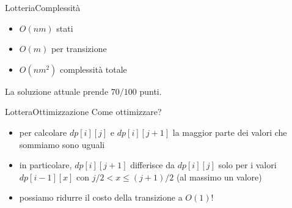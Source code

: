 \documentclass{beamer}
\begin{document}
\begin{frame}
\end{frame}

\begin{frame}{Lotteria}{Complessit\`a}
    \begin{itemize}
        \item $O(n m)$ stati
        \item $O(m)$ per transizione
        \pause
        \item $O(n m^2)$ complessit\`a totale
    \end{itemize}
    \pause
    La soluzione attuale prende $70/100$ punti.
\end{frame}

\begin{frame}{Lottera}{Ottimizzazione}
    Come ottimizzare?
    \pause
    \begin{itemize}
        \item per calcolare $dp[i][j]$ e $dp[i][j+1]$ la maggior parte dei valori che sommiamo sono uguali
        \pause
        \item in particolare, $dp[i][j+1]$ differisce da $dp[i][j]$ solo per i valori $dp[i-1][x]$ con $j/2 < x \leq (j+1)/2$ (al massimo un valore)
        \pause
        \item possiamo ridurre il costo della transizione a $O(1)$!
    \end{itemize}
\end{frame}
\end{document}
